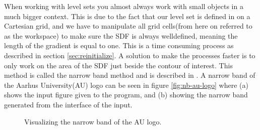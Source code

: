 When working with level sets you almost always work with small objects
in a much bigger context. This is due to the fact that our level set
is defined in on a Cartesian grid, and we have to manipulate all grid
cells(from here on referred to as the workspace) to make sure the SDF
is always welldefined, meaning the length of the gradient is equal to
one. This is a time consuming process as described in
section \vref{sec:reinitialize}. A solution to make the processes
faster is to only work on the area of the SDF just beside the contour
of interest. This method is called the narrow band method and is
described in . A narrow band of the Aarhus
University(AU) logo can be seen in figure \vref{fig:nb-au-logo} where (a)
shows the input figure given to the program, and (b) showing the
narrow band generated from the interface of the input.


\begin{figure}[h]
  \centering

  \caption{Visualizing the narrow band of the AU logo.}
  \label{fig:nb-au-logo}
\end{figure}

